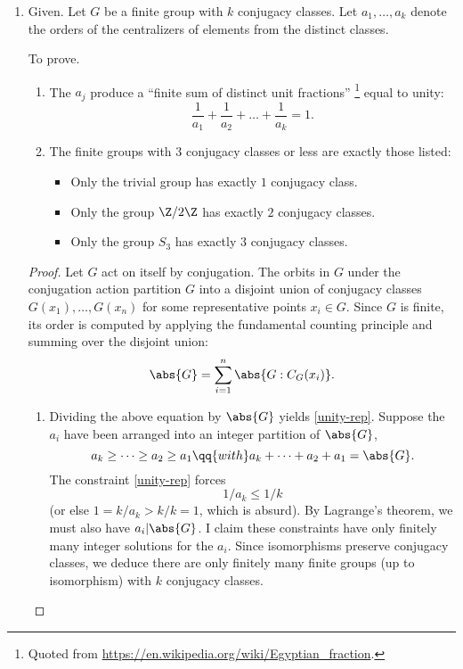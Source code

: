 \documentclass[onesided]{ccg-pset}
\begin{document}
\begin{enumerate}
\item Given. Let $G$ be a finite group with $k$ conjugacy classes. Let $a_1, \ldots, a_k$ denote the orders of the centralizers of elements from the distinct classes.

    To prove.
    \begin{enumerate}
        \item The $a_j$ produce a ``finite sum of distinct unit fractions''%
            \footnote{%
                Quoted from \url{https://en.wikipedia.org/wiki/Egyptian_fraction}.
            }
        equal to unity:
          \begin{equation}
              \label{unity-rep}
              \frac{1}{a_1} + \frac{1}{a_2} + \ldots + \frac{1}{a_k} = 1.
          \end{equation}
      \item The finite groups with $3$ conjugacy classes or less are exactly those listed:
          \begin{itemize}
              \item Only the trivial group has exactly $1$ conjugacy class.
              \item Only the group $\Z/2\Z$ has exactly $2$ conjugacy classes. 
              \item Only the group $S_3$ has exactly $3$ conjugacy classes.
          \end{itemize}
    \end{enumerate}

    \begin{proof}
        Let $G$ act on itself by conjugation. The orbits in $G$ under the conjugation action partition $G$ into a disjoint union of conjugacy classes $G(x_1), \ldots, G(x_n)$ for some representative points $x_i \in G$. Since $G$ is finite, its order is computed by applying the fundamental counting principle and summing over the disjoint union:
        \begin{equation*}
            \abs{G} = \sum_{i=1}^n \abs{G: C_G(x_i)}.
        \end{equation*}
        
    \begin{enumerate}
        \item Dividing the above equation by $\abs{G}$ yields \eqref{unity-rep}. Suppose the $a_i$ have been arranged into an integer partition of $\abs{G}$,
            \begin{equation*}
                a_k \ge \cdots \ge a_2 \ge a_1 \qq{ with } a_k + \cdots + a_2 + a_1 = \abs{G}.
            \end{equation*}
            The constraint \eqref{unity-rep} forces $$1/a_k \le 1/k$$ (or else $1 = k/a_k > k/k = 1$, which is absurd). By Lagrange's theorem, we must also have $a_i | \abs{G}$. I claim these constraints have only finitely many integer solutions for the $a_i$. Since isomorphisms preserve conjugacy classes, we deduce there are only finitely many finite groups (up to isomorphism) with $k$ conjugacy classes.
            

\end{enumerate}
\end{proof}
\end{enumerate}
\end{document}
